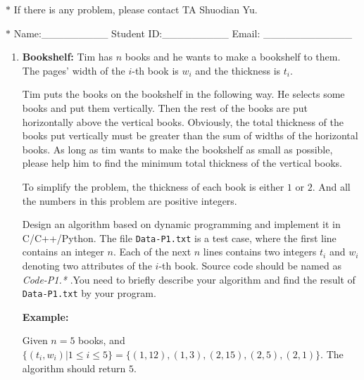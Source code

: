 \documentclass[12pt,a4paper]{article}
\makeatletter
\newtheorem*{solution}{Solution}
\theoremstyle{definition}
\renewenvironment{solution}[1][Solution] {\par\pushQED{\qed}\normalfont\topsep6\p@\@plus6\p@\relax\trivlist\item[\hskip\labelsep\bfseries#1\@addpunct{.}]\ignorespaces}{\popQED\endtrivlist\@endpefalse} \makeatother
\makeatother
\begin{document}
\noindent

\noindent{}
\begin{center}
\footnotesize{\color{red}$*$ If there is any problem, please contact TA Shuodian Yu.}

\footnotesize{\color{blue}$*$ Name:\_\_\_\_\_\_\_\_\_  \quad Student ID:\_\_\_\_\_\_\_\_\_ \quad Email: \_\_\_\_\_\_\_\_\_\_\_\_}
\end{center}

\begin{enumerate}
    \item
    \textbf{Bookshelf: }Tim has $n$ books and he wants to make a bookshelf to them. The pages' width of the $i$-th book is $w_i$ and the thickness is $t_i$. 

    Tim puts the books on the bookshelf in the following way. He selects some books and put them vertically. Then the rest of the books are put horizontally above the vertical books. Obviously, the total thickness of the books put vertically must be greater than the sum of widths of the horizontal books. As long as tim wants to make the bookshelf as small as possible, please help him to find the minimum total thickness of the vertical books.

    To simplify the problem, the thickness of each book is either $1$ or $2$. And all the numbers in this problem are positive integers.

    Design an algorithm based on dynamic programming and implement it in C/C++/Python. The file \texttt{Data-P1.txt} is a test case, where the first line contains an integer $n$. Each of the next $n$ lines contains two integers $t_i$ and $w_i$ denoting two attributes of the $i$-th book. Source code should be named as
    {\color{red}\emph{Code-P1.*}} .You need to briefly describe your algorithm and find the result of \texttt{Data-P1.txt} by your program.

    \textbf{Example:}

    Given $n=5$ books, and $\{(t_i,w_i)|1\leq i \leq 5\} = \{(1,12),(1,3),(2,15),(2,5),(2,1)\}$. The algorithm should return $5$.



\end{enumerate}
\end{document}
